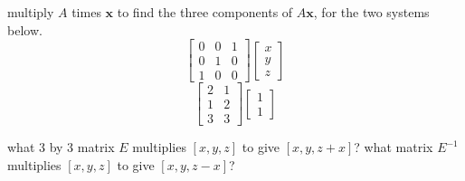\documentclass[addpoints]{exam}
\begin{document}
\begin{questions}
\question multiply $A$ times $\mathbf{x}$ to find the three components of $A\mathbf{x}$, for the two systems below.
\begin{equation*}
	\begin{bmatrix}
	0 & 0 & 1 \\
	0 & 1 & 0 \\
	1 & 0 & 0
	\end{bmatrix}
	\begin{bmatrix}
	 x \\
	 y \\
	 z
	\end{bmatrix}
\end{equation*}
\begin{equation*}
	\begin{bmatrix}
	2 & 1  \\
	1 & 2 \\
	3 & 3
	\end{bmatrix}
	\begin{bmatrix}
	 1 \\
	 1
	\end{bmatrix}
\end{equation*}

\question
{}

\question what 3 by 3 matrix $E$ multiplies $[x, y, z]$ to give $[x, y, z+x]$?
what matrix $E^{-1}$ multiplies $[x, y, z]$ to give $[x, y, z-x]$?


\end{questions}
\end{document}
